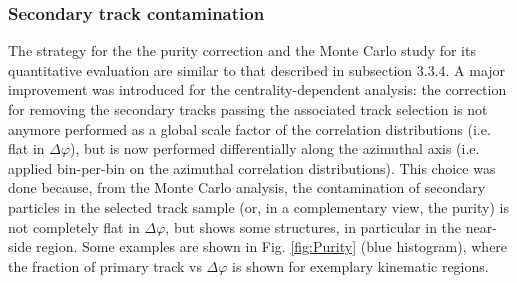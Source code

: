 \subsubsection{Secondary track contamination}
The strategy for the the purity correction and the Monte Carlo study for its quantitative evaluation are similar to that described in subsection 3.3.4.
A major improvement was introduced for the centrality-dependent analysis: the correction for removing the secondary tracks passing the associated track selection is not anymore performed as a global scale factor of the correlation distributions (i.e. flat in $\Delta\varphi$), but is now performed differentially along the azimuthal axis (i.e. applied bin-per-bin on the azimuthal correlation distributions).
This choice was done because, from the Monte Carlo analysis, the contamination of secondary particles in the selected track sample (or, in a complementary view, the purity) is not completely flat in $\Delta\varphi$, but shows some structures, in particular in the near-side region. Some examples are shown in Fig. \ref{fig:Purity} (blue histogram), where the fraction of primary track vs $\Delta\varphi$ is shown for exemplary kinematic regions.

